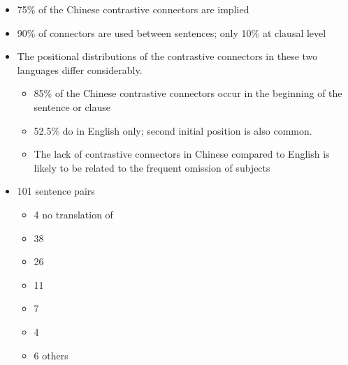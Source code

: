 \documentclass[a4paper,landscape,headrule,footrule,xetex]{foils}
\begin{document}
\begin{itemize}
\item 75\% of the Chinese contrastive connectors are implied
\item  90\% of connectors are used between sentences; only 10\%  at clausal level
\item  The positional distributions of the contrastive connectors in
these two languages differ considerably.
\begin{itemize}
\item  85\% of the Chinese contrastive connectors occur in the
beginning of the sentence or clause
\item 52.5\% do in English only; second initial position is also common.
\item The lack of contrastive connectors in Chinese compared to
  English is likely to be related to the frequent omission of subjects
\end{itemize}
\end{itemize}

 \makexeCJKactive
\begin{itemize}
\item 101 sentence pairs
  \begin{itemize}
  \item 4  no translation of 
  \item 38   
  \item 26  
  \item 11  
  \item 7  
  \item 4  
  \item 6 others
  \end{itemize}
\end{itemize}
 \makexeCJKinactive
{}
\end{document}
